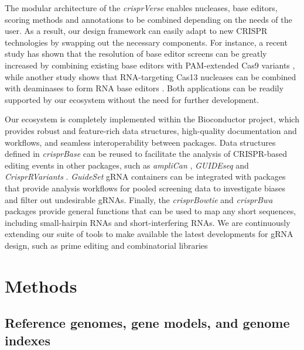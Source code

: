 \documentclass[pdftex,english,10pt]{article}
\begin{document}
The modular architecture of the \textit{crisprVerse} enables nucleases, base editors, scoring methods and annotations to be combined depending on the needs of the user. As a result, our design framework can easily adapt to new CRISPR technologies by swapping out the necessary components. For instance, a recent study has shown that the resolution of base editor screens can be greatly increased by combining existing base editors with PAM-extended Cas9 variants \citep{sangree2021benchmarking}, while another study shows that RNA-targeting Cas13 nucleases can be combined with deaminases to form RNA base editors \citep{rnaediting1}. Both applications can be readily supported by our ecosystem without the need for further development. 


Our ecosystem is completely implemented within the Bioconductor project, which provides robust and feature-rich data structures, high-quality documentation and workflows, and seamless interoperability between packages. Data structures defined in \textit{crisprBase} can be reused to facilitate the analysis of CRISPR-based editing events in other packages, such as \textit{ampliCan} \citep{labun2019accurate}, 
\textit{GUIDEseq} \citep{zhu2017guideseq} and \textit{CrisprRVariants} \citep{lindsay2016crisprvariants}. \textit{GuideSet} gRNA containers can be integrated with packages that provide analysis workflows for pooled screening data  \citep{wang2019integrative, imkeller2020gscreend, gcrisprtools} to investigate biases and filter out undesirable gRNAs. Finally, the \textit{crisprBowtie} and \textit{crisprBwa} packages provide general functions that can be used to map any short sequences, including small-hairpin RNAs and short-interfering RNAs. We are continuously extending our suite of tools to make available the latest developments for gRNA design, such as prime editing \citep{primeediting} and combinatorial libraries \citep{replogle2020combinatorial}
 


\section*{Methods}



\subsection*{Reference genomes, gene models, and genome indexes}
\end{document}
